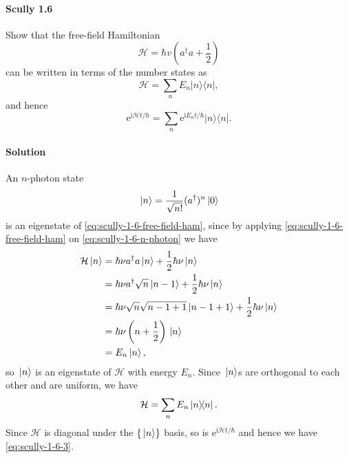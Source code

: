 \documentclass[hyperref, a4paper]{article}
\newcommand*{\ii}{\mathrm{i}}
\newcommand*{\ee}{\mathrm{e}}
\newcommand{\mathscr}{\mathcal}
\begin{document}
\paragraph{}

\paragraph{Scully 1.6} Show that the free-field Hamiltonian
\begin{equation}
    \mathscr{H}=\hbar v\left(a^{\dagger} a+\frac{1}{2}\right)
    \label{eq:scully-1-6-free-field-ham}
\end{equation}
can be written in terms of the number states as
\[
\mathscr{H}=\sum_{n} E_{n}|n\rangle\langle n|,
\]
and hence
\begin{equation}
    \ee^{\ii \mathscr{H} t / \hbar}=\sum_{n} \ee^{\ii E_{n} t / \hbar}|n\rangle\langle n|.
    \label{eq:scully-1-6-3}
\end{equation}

\paragraph{Solution} An $n$-photon state
\begin{equation}
    \ket*{n} = \frac{1}{\sqrt{n!}} (a^\dagger)^n \ket*{0}
    \label{eq:scully-1-6-n-photon}
\end{equation}
is an eigenstate of \eqref{eq:scully-1-6-free-field-ham}, since by applying \eqref{eq:scully-1-6-free-field-ham} on \eqref{eq:scully-1-6-n-photon} we have
\[
    \begin{aligned}
        \mathcal{H} \ket*{n} &= \hbar \nu a^\dagger a \ket*{n} + \frac{1}{2} \hbar \nu \ket*{n} \\
        &= \hbar \nu a^\dagger \sqrt{n} \ket*{n-1} + \frac{1}{2} \hbar \nu \ket*{n} \\
        &= \hbar \nu \sqrt{n} \sqrt{n-1+1} \ket*{n-1+1} + \frac{1}{2} \hbar \nu \ket*{n} \\
        &= \hbar \nu \left( n + \frac{1}{2} \right) \ket*{n} \\
        &= E_n \ket*{n},
    \end{aligned}
\]
so $\ket*{n}$ is an eigenstate of $\mathcal{H}$ with energy $E_n$.
Since $\ket*{n}$s are orthogonal to each other and are uniform, we have
\begin{equation}
    \mathcal{H} = \sum_n E_n \dyad*{n}.
\end{equation}
Since $\mathcal{H}$ is diagonal under the $\{\ket*{n}\}$ basis, so is $\ee^{\ii \mathcal{H} t / \hbar}$ and hence we have \eqref{eq:scully-1-6-3}.
\end{document}
